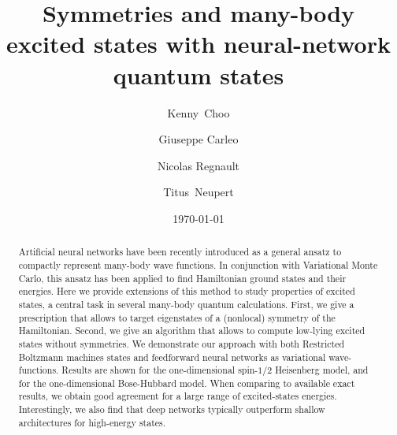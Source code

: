 \documentclass[aps,prl,twocolumn,amsmath,amssymb,superscriptaddress,floatfix]{revtex4-1}
\begin{document}

\newcommand{\cbl}[1]{\color{blue} #1 \color{black}}

\newcommand{\vk}{{\bf k}}


\title{Symmetries and many-body excited states with neural-network quantum states}

\author{
Kenny~Choo}
\address{
 Department of Physics, University of Zurich, Winterthurerstrasse 190, 8057 Zurich, Switzerland
}

\author{Giuseppe Carleo}
\address{
Center for Computational Quantum Physics, Flatiron Institute, 162 5th Avenue, New York, NY 10010, USA
}

\author{Nicolas Regnault}
\address{
Laboratoire Pierre Aigrain, Ecole normale sup\'erieure, PSL University, 
Sorbonne Universit\'e, Universit\'e Paris Diderot, Sorbonne Paris Cit\'e, 
CNRS, 24 rue Lhomond, 75005 Paris France
}

\author{
Titus~Neupert}
\address{
 Department of Physics, University of Zurich, Winterthurerstrasse 190, 8057 Zurich, Switzerland
}

\begin{abstract}
Artificial neural networks have been recently introduced as a general ansatz to compactly represent many-body wave functions. 
In conjunction with Variational Monte Carlo, this ansatz has been applied to find Hamiltonian ground states and their energies. Here we provide extensions of this method to study properties of excited states, a central task in several many-body quantum calculations. First, we give a prescription that allows to target eigenstates of a (nonlocal) symmetry of the Hamiltonian. Second, we give an algorithm that allows to compute low-lying excited states without symmetries. We demonstrate our approach with both Restricted Boltzmann machines states and feedforward neural networks as variational wave-functions. Results are shown for the one-dimensional spin-$1/2$ Heisenberg model, and for the one-dimensional Bose-Hubbard model.  When comparing to available exact results, we obtain good agreement for a large range of excited-states energies. Interestingly, we also find that deep networks typically outperform shallow architectures for high-energy states.  \end{abstract}

\date{\today}

\maketitle
\end{document}
